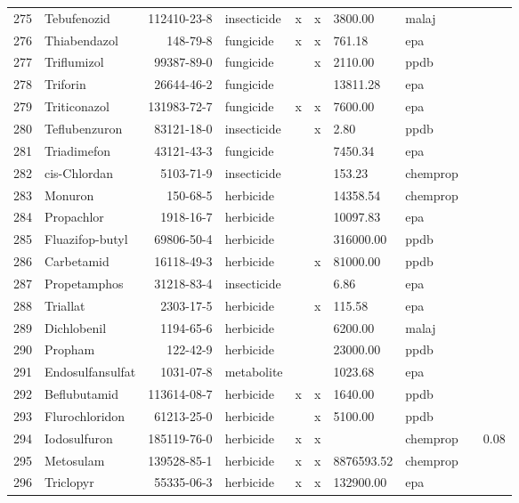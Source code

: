 \begin{longtable}{lp{3cm}rlp{0.5cm}p{0.5cm}p{1.5cm}p{1cm}p{1cm}p{1cm}}
  275 & Tebufenozid & 112410-23-8 & insecticide & x & x & 3800.00 & malaj &  &  \\ 
  276 & Thiabendazol & 148-79-8 & fungicide & x & x & 761.18 & epa &  &  \\ 
  277 & Triflumizol & 99387-89-0 & fungicide &  & x & 2110.00 & ppdb &  &  \\ 
  278 & Triforin & 26644-46-2 & fungicide &  &  & 13811.28 & epa &  &  \\ 
  279 & Triticonazol & 131983-72-7 & fungicide & x & x & 7600.00 & epa &  &  \\ 
  280 & Teflubenzuron & 83121-18-0 & insecticide &  & x & 2.80 & ppdb &  &  \\ 
  281 & Triadimefon & 43121-43-3 & fungicide &  &  & 7450.34 & epa &  &  \\ 
  282 & cis-Chlordan & 5103-71-9 & insecticide &  &  & 153.23 & chemprop &  &  \\ 
  283 & Monuron & 150-68-5 & herbicide &  &  & 14358.54 & chemprop &  &  \\ 
  284 & Propachlor & 1918-16-7 & herbicide &  &  & 10097.83 & epa &  &  \\ 
  285 & Fluazifop-butyl & 69806-50-4 & herbicide &  &  & 316000.00 & ppdb &  &  \\ 
  286 & Carbetamid & 16118-49-3 & herbicide &  & x & 81000.00 & ppdb &  &  \\ 
  287 & Propetamphos & 31218-83-4 & insecticide &  &  & 6.86 & epa &  &  \\ 
  288 & Triallat & 2303-17-5 & herbicide &  & x & 115.58 & epa &  &  \\ 
  289 & Dichlobenil & 1194-65-6 & herbicide &  &  & 6200.00 & malaj &  &  \\ 
  290 & Propham & 122-42-9 & herbicide &  &  & 23000.00 & ppdb &  &  \\ 
  291 & Endosulfansulfat & 1031-07-8 & metabolite &  &  & 1023.68 & epa &  &  \\ 
  292 & Beflubutamid & 113614-08-7 & herbicide & x & x & 1640.00 & ppdb &  &  \\ 
  293 & Flurochloridon & 61213-25-0 & herbicide &  & x & 5100.00 & ppdb &  &  \\ 
  294 & Iodosulfuron & 185119-76-0 & herbicide & x & x &  & chemprop &  & 0.08 \\ 
  295 & Metosulam & 139528-85-1 & herbicide & x & x & 8876593.52 & chemprop &  &  \\ 
  296 & Triclopyr & 55335-06-3 & herbicide & x & x & 132900.00 & epa &  &  \\ 

\end{longtable}
